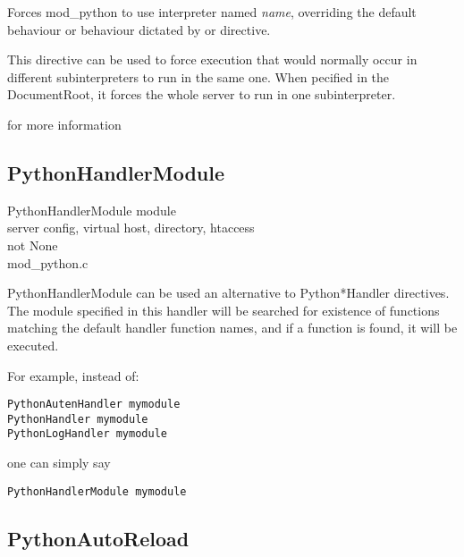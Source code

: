 Forces mod_python to use interpreter named \emph{name}, overriding the
default behaviour or behaviour dictated by
 or
 directive.

This directive can be used to force execution that would normally
occur in different subinterpreters to run in the same one. When
pecified in the DocumentRoot, it forces the whole server to run in one
subinterpreter.

\begin{seealso}
	{for more information}
\end{seealso}

\subsection{PythonHandlerModule\label{dir-other-phm}}

PythonHandlerModule module \\
server config, virtual host, directory, htaccess\\
not None\\
mod_python.c

PythonHandlerModule can be used an alternative to Python*Handler
directives. The module specified in this handler will be searched for
existence of functions matching the default handler function names,
and if a function is found, it will be executed.

For example, instead of:
\begin{verbatim}
PythonAutenHandler mymodule
PythonHandler mymodule
PythonLogHandler mymodule
\end{verbatim}    

one can simply say
\begin{verbatim}
PythonHandlerModule mymodule
\end{verbatim}    

\subsection{PythonAutoReload\label{dir-other-par}}

